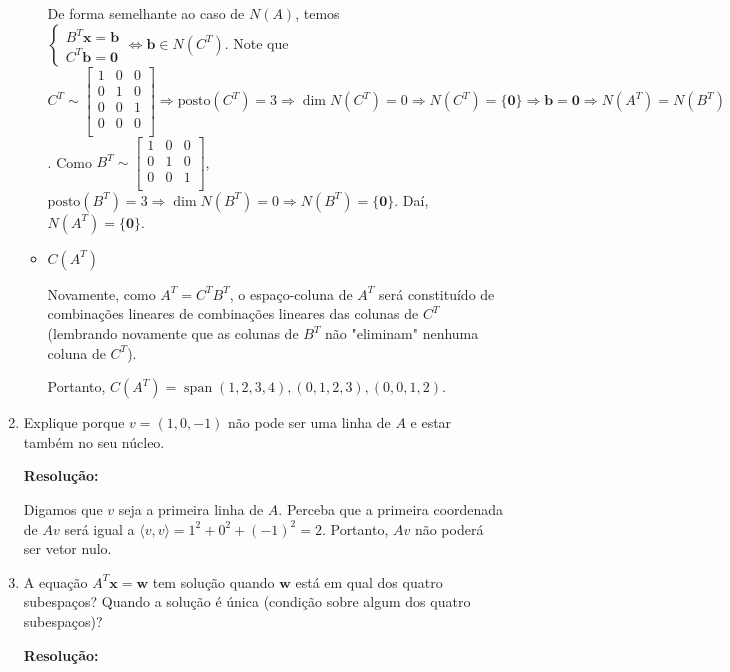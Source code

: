 \documentclass[leqno]{article}
\DeclareMathOperator{\spn}{span}
\newcommand{\pst}[1]{\text{posto}(#1)}
\begin{document}
\begin{enumerate}
\begin{itemize}
        De forma semelhante ao caso de $N(A)$, temos $\begin{cases}B^T\textbf{x}=\textbf{b}\\C^T\textbf{b}=\textbf{0}\end{cases}\iff \textbf{b}\in N(C^T)$. Note que $C^T\sim \begin{bmatrix}
        1 & 0 & 0\\
        0 & 1 & 0\\
        0 & 0 & 1\\
        0 & 0 & 0\\
        \end{bmatrix}\Rightarrow\pst{C^T}=3\Rightarrow\dim{N(C^T)}=0\Rightarrow N(C^T)=\{\textbf{0}\}\Rightarrow \textbf{b}=\textbf{0}\Rightarrow N(A^T)=N(B^T)$. Como $B^T\sim\begin{bmatrix}
        1 & 0 & 0\\
        0 & 1 & 0\\
        0 & 0 & 1\\
        \end{bmatrix}$, $\pst{B^T}=3\Rightarrow\dim{N(B^T)}=0\Rightarrow N(B^T)=\{\textbf{0}\}$. Daí, $N(A^T)=\{\textbf{0}\}$.
        
        \item $C(A^T)$
        
        Novamente, como $A^T=C^TB^T$, o espaço-coluna de $A^T$ será constituído de combinações lineares de combinações lineares das colunas de $C^T$ (lembrando novamente que as colunas de $B^T$ não "eliminam" nenhuma coluna de $C^T$).
        
        Portanto, $C(A^T)=\spn{(1,2,3,4),(0,1,2,3),(0,0,1,2)}$.
        \end{itemize}
    
    \item Explique porque $v=(1,0,-1)$ não pode ser uma linha de $A$ e estar também no seu núcleo.
    
    \textbf{Resolução:}
    
    Digamos que $v$ seja a primeira linha de $A$. Perceba que a primeira coordenada de $Av$ será igual a $\langle v,v\rangle=1^2+0^2+(-1)^2=2$. Portanto, $Av$ não poderá ser vetor nulo.
    
    \item A equação $A^T\textbf{x}=\textbf{w}$ tem solução quando $\textbf{w}$ está em qual dos quatro subespaços? Quando a solução é única (condição sobre algum dos quatro subespaços)?
    
    \textbf{Resolução:}
    

\end{enumerate}
\end{document}
